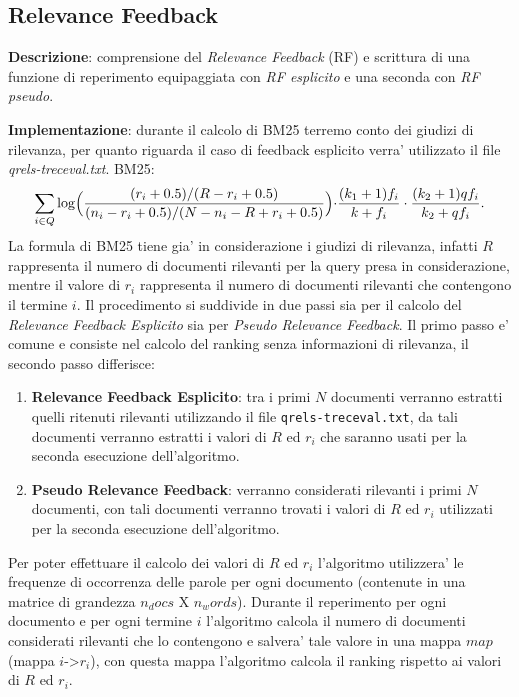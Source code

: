 \subsection{Relevance Feedback}
\label{sec:relevance-feedback}

\textbf{Descrizione}: comprensione del \textit{Relevance Feedback} (RF) e scrittura di una funzione di reperimento equipaggiata con \textit{RF esplicito} e una seconda con \textit{RF pseudo}.

\textbf{Implementazione}: durante il calcolo di BM25 terremo conto dei giudizi di rilevanza, per quanto riguarda il caso di feedback esplicito verra' utilizzato il file \textit{qrels-treceval.txt}.
BM25:
\[ \sum\limits_{i \in Q}\log\Bigl(\frac{(r_i+0.5)/(R-r_i+0.5)}{(n_i-r_i+0.5)/(N-n_i-R+r_i+0.5)}\Bigl)\cdot\frac{(k_1+1)f_i}{k+f_i}\cdot\frac{(k_2+1)qf_i}{k_2+qf_i}. \]
La formula di BM25 tiene gia' in considerazione i giudizi di rilevanza, infatti $R$ rappresenta il numero di documenti rilevanti per la query presa in considerazione, mentre il valore di $r_i$ rappresenta il numero di documenti rilevanti che contengono il termine $i$.
Il procedimento si suddivide in due passi sia per il calcolo del \textit{Relevance Feedback Esplicito} sia per \textit{Pseudo Relevance Feedback}.
Il primo passo e' comune e consiste nel calcolo del ranking senza informazioni di rilevanza, il secondo passo differisce:
\begin{enumerate}
\item \textbf{Relevance Feedback Esplicito}: tra i primi $N$ documenti verranno estratti quelli ritenuti rilevanti utilizzando il file \texttt{qrels-treceval.txt}, da tali documenti verranno estratti i valori di $R$ ed $r_i$ che saranno usati per la seconda esecuzione dell'algoritmo.
\item \textbf{Pseudo Relevance Feedback}: verranno considerati rilevanti i primi $N$ documenti, con tali documenti verranno trovati i valori di $R$ ed $r_i$ utilizzati per la seconda esecuzione dell'algoritmo.
\end{enumerate}
Per poter effettuare il calcolo dei valori di $R$ ed $r_i$ l'algoritmo utilizzera' le frequenze di occorrenza delle parole per ogni documento (contenute in una matrice di grandezza $n_docs$ X $n_words$). Durante il reperimento per ogni documento e per ogni termine $i$ l'algoritmo calcola il numero di documenti considerati rilevanti che lo contengono e salvera' tale valore in una mappa $map$ (mappa $i$->$r_i$), con questa mappa l'algoritmo calcola il ranking rispetto ai valori di $R$ ed $r_i$.


